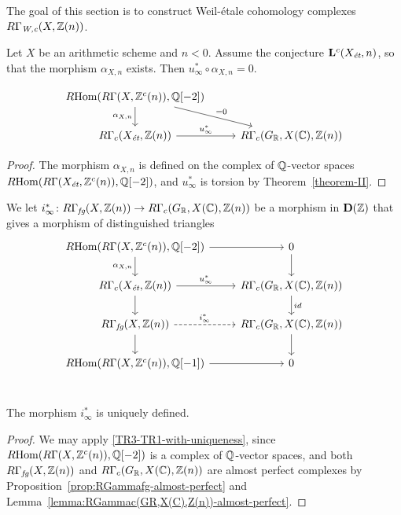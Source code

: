 \documentclass{article}
\numberwithin{equation}{section}
\begin{document}
The goal of this section is to construct Weil-étale cohomology complexes
$R\Gamma_\Wc (X, \ZZ(n))$.

\begin{lemma}
  Let $X$ be an arithmetic scheme and $n < 0$. Assume the conjecture
  $\mathbf{L}^c (X_\et, n)$, so that the morphism $\alpha_{X,n}$ exists.
  Then $u_\infty^* \circ \alpha_{X,n} = 0$.

  \[ \begin{tikzcd}
    \RHom (R\Gamma (X, \ZZ^c (n)), \QQ [-2]) \ar{d}[swap]{\alpha_{X,n}}\ar{dr}{= 0} \\
      R\Gamma_c (X_\et, \ZZ (n)) \ar{r}{u_\infty^*} & R\Gamma_c (G_\RR, X (\CC), \ZZ (n))
    \end{tikzcd} \]

  \begin{proof}
    The morphism $\alpha_{X,n}$ is defined on the complex of $\QQ$-vector spaces
    $\RHom (R\Gamma (X_\et, \ZZ^c (n)), \QQ [-2])$, and $u_\infty^*$ is torsion
    by Theorem~\ref{theorem-II}.
  \end{proof}
\end{lemma}

\begin{definition}
  \label{dfn:i-infty}
  We let
  $i_\infty^*\colon R\Gamma_\fg (X, \ZZ (n)) \to R\Gamma_c (G_\RR, X (\CC), \ZZ (n))$
  be a morphism in $\mathbf{D} (\ZZ)$ that gives a morphism of distinguished
  triangles
  \begin{equation}
    \label{eqn:triangle-defining-i-infty}
    \begin{tikzcd}
      \RHom (R\Gamma (X, \ZZ^c (n)), \QQ [-2]) \ar{d}[swap]{\alpha_{X,n}}\ar{r} & 0\ar{d} \\
      R\Gamma_c (X_\et, \ZZ (n)) \ar{r}{u_\infty^*}\ar{d} &  R\Gamma_c (G_\RR, X (\CC), \ZZ (n)) \ar{d}{id} \\
      R\Gamma_\fg (X, \ZZ (n)) \ar[dashed]{r}{i_\infty^*}\ar{d} & R\Gamma_c (G_\RR, X (\CC), \ZZ (n)) \ar{d} \\
      \RHom (R\Gamma (X, \ZZ^c (n)), \QQ [-1])\ar{r} & 0 \\
    \end{tikzcd}
  \end{equation}
\end{definition}

\begin{proposition}
  \label{prop:uniqueness-of-i-infty}
  The morphism $i_\infty^*$ is uniquely defined.

  \begin{proof}
    We may apply \ref{TR3-TR1-with-uniqueness}, since
    $\RHom (R\Gamma (X, \ZZ^c (n)), \QQ [-2])$ is a complex of $\QQ$-vector
    spaces, and both
    $R\Gamma_\fg (X, \ZZ (n))$ and
    $R\Gamma_c (G_\RR, X (\CC), \ZZ (n))$
    are almost perfect complexes by
    Proposition~\ref{prop:RGammafg-almost-perfect} and
    Lemma~\ref{lemma:RGammac(GR,X(C),Z(n))-almost-perfect}.
  \end{proof}
\end{proposition}
\end{document}
